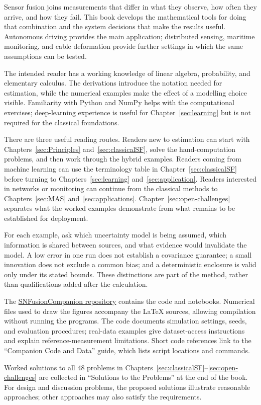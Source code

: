 \preface
\enlargethispage{2\baselineskip}
Sensor fusion joins measurements that differ in what they observe, how often they arrive, and how they fail. This book develops the mathematical tools for doing that combination and the system decisions that make the results useful. Autonomous driving provides the main application; distributed sensing, maritime monitoring, and cable deformation provide further settings in which the same assumptions can be tested.

The intended reader has a working knowledge of linear algebra, probability, and elementary calculus. The derivations introduce the notation needed for estimation, while the numerical examples make the effect of a modelling choice visible. Familiarity with Python and NumPy helps with the computational exercises; deep-learning experience is useful for Chapter~\ref{sec:learning} but is not required for the classical foundations.

There are three useful reading routes. Readers new to estimation can start with Chapters~\ref{sec:Principles} and~\ref{sec:classicalSF}, solve the hand-computation problems, and then work through the hybrid examples. Readers coming from machine learning can use the terminology table in Chapter~\ref{sec:classicalSF} before turning to Chapters~\ref{sec:learning} and~\ref{sec:application}. Readers interested in networks or monitoring can continue from the classical methods to Chapters~\ref{sec:MAS} and~\ref{sec:applications}. Chapter~\ref{sec:open-challenges} separates what the worked examples demonstrate from what remains to be established for deployment.

For each example, ask which uncertainty model is being assumed, which information is shared between sources, and what evidence would invalidate the model. A low error in one run does not establish a covariance guarantee; a small innovation does not exclude a common bias; and a deterministic enclosure is valid only under its stated bounds. These distinctions are part of the method, rather than qualifications added after the calculation.

The \href{https://github.com/DrFuzzy/SNFusionCompanion}{SNFusionCompanion repository} contains the code and notebooks. Numerical files used to draw the figures accompany the LaTeX sources, allowing compilation without running the programs. The code documents simulation settings, seeds, and evaluation procedures; real-data examples give dataset-access instructions and explain reference-measurement limitations. Short code references link to the ``Companion Code and Data'' guide, which lists script locations and commands.

Worked solutions to all 48 problems in Chapters~\ref{sec:classicalSF}--\ref{sec:open-challenges} are collected in ``Solutions to the Problems'' at the end of the book. For design and discussion problems, the proposed solutions illustrate reasonable approaches; other approaches may also satisfy the requirements.
